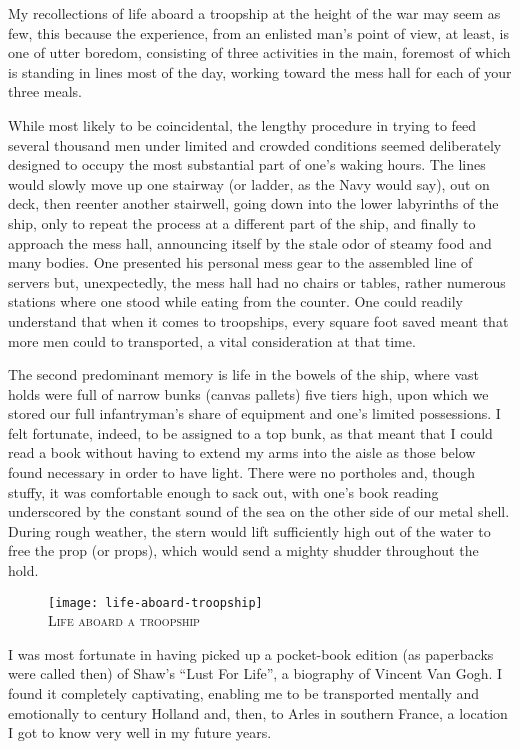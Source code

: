 \documentclass[../m3y]{subfiles}
\begin{document}
My recollections of life aboard a troopship at the height of the war may seem as few, this because the experience, from an enlisted man's point of view, at least, is one of utter boredom, consisting of three activities in the main, foremost of which is standing in lines most of the day, working toward the mess hall for each of your three meals.

While most likely to be coincidental, the lengthy procedure in trying to feed several thousand men under limited and crowded conditions seemed deliberately designed to occupy the most substantial part of one's waking hours. The lines would slowly move up one stairway (or ladder, as the Navy would say), out on deck, then reenter another stairwell, going down into the lower labyrinths of the ship, only to repeat the process at a different part of the ship, and finally to approach the mess hall, announcing itself by the stale odor of steamy food and many bodies. One presented his personal mess gear to the assembled line of servers but, unexpectedly, the mess hall had no chairs or tables, rather numerous stations where one stood while eating from the counter. One could readily understand that when it comes to troopships, every square foot saved meant that more men could to transported, a vital consideration at that time.

The second predominant memory is life in the bowels of the ship, where vast holds were full of narrow bunks (canvas pallets) five tiers high, upon which we stored our full infantryman's share of equipment and one's limited possessions. I felt fortunate, indeed, to be assigned to a top bunk, as that meant that I could read a book without having to extend my arms into the aisle as those below found necessary in order to have light. There were no portholes and, though stuffy, it was comfortable enough to sack out, with one's book reading underscored by the constant sound of the sea on the other side of our metal shell. During rough weather, the stern would lift sufficiently high out of the water to free the prop (or props), which would send a mighty shudder throughout the hold.

\begin{figure}
\centering
\texttt{[image: life-aboard-troopship]}\\
\medskip
{\newtimes\textsc{Life aboard a troopship}}
\end{figure}

I was most fortunate in having picked up a pocket-book edition (as paperbacks were called then) of Shaw's ``Lust For Life'', a biography of Vincent Van Gogh. I found it completely captivating, enabling me to be transported mentally and emotionally to  century Holland and, then, to Arles in southern France, a location I got to know very well in my future years.
\end{document}
